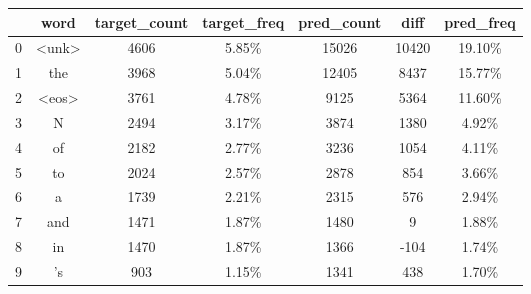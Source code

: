 \begin{tabular}{lcccccc}
\hline
\textbf{} & \textbf{word} & \textbf{target\_count} & \textbf{target\_freq} & \textbf{pred\_count} & \textbf{diff} & \textbf{pred\_freq} \\
\hline
0 & \textless unk\textgreater & 4606 & 5.85\% & 15026 & 10420 & 19.10\% \\
\hline
1 & the & 3968 & 5.04\% & 12405 & 8437 & 15.77\% \\
\hline
2 & \textless eos\textgreater & 3761 & 4.78\% & 9125 & 5364 & 11.60\% \\
\hline
3 & N & 2494 & 3.17\% & 3874 & 1380 & 4.92\% \\
\hline
4 & of & 2182 & 2.77\% & 3236 & 1054 & 4.11\% \\
\hline
5 & to & 2024 & 2.57\% & 2878 & 854 & 3.66\% \\
\hline
6 & a & 1739 & 2.21\% & 2315 & 576 & 2.94\% \\
\hline
7 & and & 1471 & 1.87\% & 1480 & 9 & 1.88\% \\
\hline
8 & in & 1470 & 1.87\% & 1366 & -104 & 1.74\% \\
\hline
9 & 's & 903 & 1.15\% & 1341 & 438 & 1.70\% \\
\hline
\end{tabular}